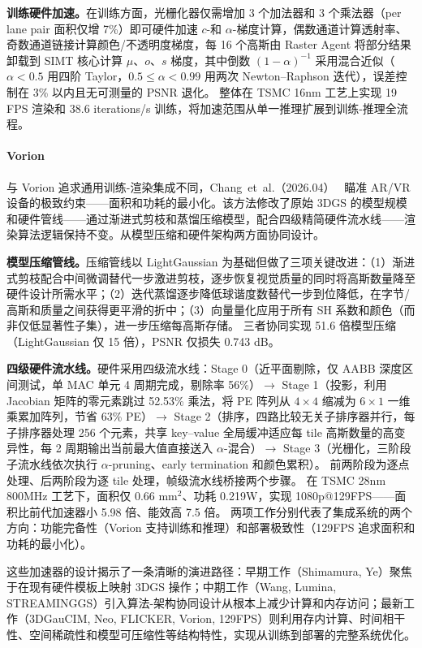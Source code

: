 \textbf{训练硬件加速。}在训练方面，光栅化器仅需增加 3 个加法器和 3 个乘法器（per lane pair 面积仅增 7\%）即可硬件加速 $c$-和 $\alpha$-梯度计算，偶数通道计算透射率、奇数通道链接计算颜色/不透明度梯度，每 16 个高斯由 Raster Agent 将部分结果卸载到 SIMT 核心计算 $\mu$、$o$、$s$ 梯度，其中倒数 $(1-\alpha)^{-1}$ 采用混合近似（$\alpha<0.5$ 用四阶 Taylor，$0.5\leq\alpha<0.99$ 用两次 Newton--Raphson 迭代），误差控制在 3\% 以内且无可测量的 PSNR 退化。
整体在 TSMC 16nm 工艺上实现 19 FPS 渲染和 38.6 iterations/s 训练，将加速范围从单一推理扩展到训练-推理全流程。

\paragraph{Vorion}
与 Vorion 追求通用训练-渲染集成不同，Chang~et~al.（2026.04）~\cite{2604_10223} 瞄准 AR/VR 设备的极致约束——面积和功耗的最小化。该方法修改了原始 3DGS 的模型规模和硬件管线——通过渐进式剪枝和蒸馏压缩模型，配合四级精简硬件流水线——渲染算法逻辑保持不变。从模型压缩和硬件架构两方面协同设计。

\textbf{模型压缩管线。}压缩管线以 LightGaussian 为基础但做了三项关键改进：（1）渐进式剪枝配合中间微调替代一步激进剪枝，逐步恢复视觉质量的同时将高斯数量降至硬件设计所需水平；（2）迭代蒸馏逐步降低球谐度数替代一步到位降低，在字节/高斯和质量之间获得更平滑的折中；（3）向量量化应用于所有 SH 系数和颜色（而非仅低显著性子集），进一步压缩每高斯存储。
三者协同实现 51.6 倍模型压缩（LightGaussian 仅 15 倍），PSNR 仅损失 0.743 dB。

\textbf{四级硬件流水线。}硬件采用四级流水线：Stage 0（近平面剔除，仅 AABB 深度区间测试，单 MAC 单元 4 周期完成，剔除率 56\%）$\to$ Stage 1（投影，利用 Jacobian 矩阵的零元素跳过 52.53\% 乘法，将 PE 阵列从 $4{\times}4$ 缩减为 $6{\times}1$ 一维乘累加阵列，节省 63\% PE）$\to$ Stage 2（排序，四路比较无关子排序器并行，每子排序器处理 256 个元素，共享 key--value 全局缓冲适应每 tile 高斯数量的高变异性，每 2 周期输出当前最大值直接送入 $\alpha$-混合）$\to$ Stage 3（光栅化，三阶段子流水线依次执行 $\alpha$-pruning、early termination 和颜色累积）。
前两阶段为逐点处理、后两阶段为逐 tile 处理，帧级流水线桥接两个步骤。
在 TSMC 28nm 800MHz 工艺下，面积仅 0.66 mm$^2$、功耗 0.219W，实现 1080p@129FPS——面积比前代加速器小 5.98 倍、能效高 7.5 倍。
两项工作分别代表了集成系统的两个方向：功能完备性（Vorion 支持训练和推理）和部署极致性（129FPS 追求面积和功耗的最小化）。

这些加速器的设计揭示了一条清晰的演进路径：早期工作（Shimamura, Ye）聚焦于在现有硬件模板上映射 3DGS 操作；中期工作（Wang, Lumina, STREAMINGGS）引入算法-架构协同设计从根本上减少计算和内存访问；最新工作（3DGauCIM, Neo, FLICKER, Vorion, 129FPS）则利用存内计算、时间相干性、空间稀疏性和模型可压缩性等结构特性，实现从训练到部署的完整系统优化。

